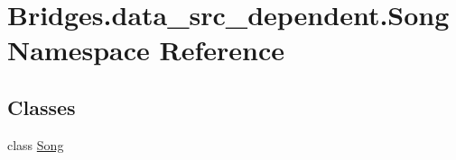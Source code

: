 \hypertarget{namespace_bridges_1_1data__src__dependent_1_1_song}{}\section{Bridges.\+data\+\_\+src\+\_\+dependent.\+Song Namespace Reference}
\label{namespace_bridges_1_1data__src__dependent_1_1_song}
\subsection*{Classes}
\begin{DoxyCompactItemize}
\item 
class \hyperlink{class_bridges_1_1data__src__dependent_1_1_song_1_1_song}{Song}
\end{DoxyCompactItemize}
